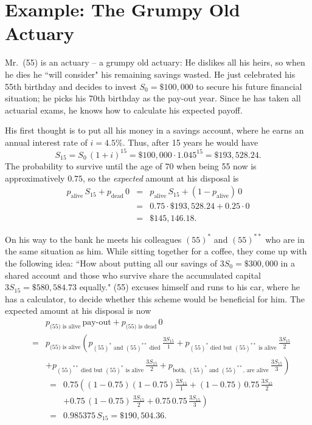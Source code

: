 \documentclass[11pt,fleqn,oneside]{book}
\begin{document}
\section{Example: The Grumpy Old Actuary}
\label{SECINEXAM}

Mr.\ (55) is an actuary -- a grumpy old actuary: He dislikes all his heirs, so when he dies he ``will consider" his remaining savings wasted. He just celebrated his 55th birthday and decides to invest $S_0= \$100,000$ to secure his future financial situation; he picks his 70th birthday as the pay-out year. Since he has taken all actuarial exams, he knows how to calculate his expected payoff. 

His first thought is to put all his money in a savings account, where he earns an annual interest rate of $i=4.5\%$. Thus, after 15 years he would have
$$
S_{15} = S_0 \,\left(1+i\right)^{15} = 
\$100,000 \cdot 1.045^{15} = \$193,528.24.
$$
The probability to survive until the age of 70 when being 55 now is approximatively $0.75$, so the \textit{expected} amount at his disposal is
\begin{eqnarray*}
p_{\text{alive}} \,S_{15} + p_{\text{dead}} \, 0 &=& p_{\text{alive}} \, S_{15} + (1- p_{\text{alive}}) \, 0\\
&=& 0.75 \cdot \$193,528.24 + 0.25 \cdot 0\\
&=& \$145,146.18.
\end{eqnarray*}

On his way to the bank he meets his colleagues $(55)^*$ and $(55)^{**}$ who are in the same situation as him. While sitting together for a coffee, they come up with the following idea: ``How about putting all our savings of $3S_0 = \$300,000$ in a shared account and those who survive share the accumulated capital $3S_{15} = \$580,584.73$ equally." (55) excuses himself and runs to his car, where he has a calculator, to decide whether this scheme would be beneficial for him. The expected amount at his disposal is now
\begin{eqnarray*}
&& p_{\text{(55) is alive}} \,\text{pay-out} + p_{\text{(55) is dead}} \, 0 \\
&=&  p_{\text{(55) is alive}} \left(p_{\text{$(55)^*$ and $(55)^{**}$ died}} \, \frac{3S_{15}}{1} +
p_{\text{$(55)^*$ died but $(55)^{**}$ is alive}} \, \frac{3S_{15}}{2} \right.\\
&\;& \left. + p_{\text{$(55)^{**}$ died but $(55)^*$ is alive}} \,\frac{3S_{15}}{2} 
+ p_{\text{both, $(55)^*$ and $(55)^{**}$, are alive}}\, \frac{3S_{15}}{3} \right) 
\end{eqnarray*}
\begin{eqnarray*}
&=& 0.75 \left( (1-0.75)(1-0.75) \frac{3S_{15}}{1} + (1-0.75) \,0.75 \, \frac{3S_{15}}{2} \right. \\
&\;& \left. + 0.75 \, (1-0.75) \, \frac{3S_{15}}{2} + 0.75\, 0.75\,  \frac{3S_{15}}{3}   \right)\\
&=& 0.985375 \, S_{15} = \$190,504.36.
\end{eqnarray*}
\end{document}
